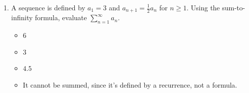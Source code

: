 \documentclass[11pt,a4paper]{article}
\begin{document}
\begin{enumerate}
\item A sequence is defined by $a_1=3$ and $a_{n+1}=\tfrac12a_n$ for $n\geq1$. Using the sum-to-infinity formula, evaluate $\displaystyle\sum_{n=1}^\infty a_n$.
\begin{itemize}
\item[A)] $6$
\item[B)] $3$
\item[C)] $4.5$
\item[D)] It cannot be summed, since it's defined by a recurrence, not a formula.
\end{itemize}

\end{enumerate}

\end{document}
